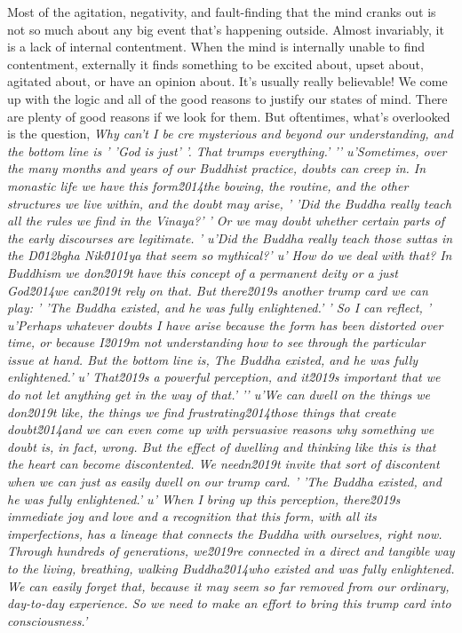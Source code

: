 Most of the agitation, negativity, and fault-finding that the mind 
cranks out is not so much about any big event that's happening outside. 
Almost invariably, it is a lack of internal contentment. When the mind 
is internally unable to find contentment, externally it finds something 
to be excited about, upset about, agitated about, or have an opinion 
about. It's usually really believable! We come up with the logic and 
all of the good reasons to justify our states of mind. There are plenty 
of good reasons if we look for them. But oftentimes, what's overlooked 
is the question, \emph{Why can't I be cre mysterious and beyond our understanding, and the bottom line is '
'God is just'
'. That trumps everything.'
'\n'
u'Sometimes, over the many months and years of our Buddhist practice, doubts can creep in. In monastic life we have this form\u2014the bowing, the routine, and the other structures we live within, and the doubt may arise, '
'Did the Buddha really teach all the rules we find in the Vinaya?'
' Or we may doubt whether certain parts of the early discourses are legitimate. '
u'Did the Buddha really teach those suttas in the D\u012bgha Nik\u0101ya that seem so mythical?'
u' How do we deal with that? In Buddhism we don\u2019t have this concept of a permanent deity or a just God\u2014we can\u2019t rely on that. But there\u2019s another trump card we can play: '
'The Buddha existed, and he was fully enlightened.'
' So I can reflect, '
u'Perhaps whatever doubts I have arise because the form has been distorted over time, or because I\u2019m not understanding how to see through the particular issue at hand. But the bottom line is, The Buddha existed, and he was fully enlightened.'
u' That\u2019s a powerful perception, and it\u2019s important that we do not let anything get in the way of that.'
'\n'
u'We can dwell on the things we don\u2019t like, the things we find frustrating\u2014those things that create doubt\u2014and we can even come up with persuasive reasons why something we doubt is, in fact, wrong. But the effect of dwelling and thinking like this is that the heart can become discontented. We needn\u2019t invite that sort of discontent when we can just as easily dwell on our trump card. '
'The Buddha existed, and he was fully enlightened.'
u' When I bring up this perception, there\u2019s immediate joy and love and a recognition that this form, with all its imperfections, has a lineage that connects the Buddha with ourselves, right now. Through hundreds of generations, we\u2019re connected in a direct and tangible way to the living, breathing, walking Buddha\u2014who existed and was fully enlightened. We can easily forget that, because it may seem so far removed from our ordinary, day-to-day experience. So we need to make an effort to bring this trump card into consciousness.'
}
